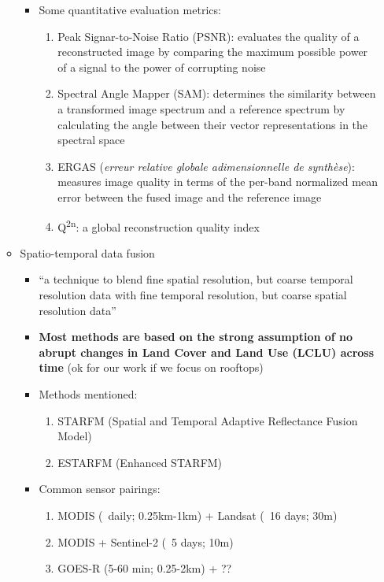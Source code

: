 \begin{itemize}
\begin{itemize}
\begin{itemize}
\begin{enumerate}
                        \end{enumerate}
                    \item Some quantitative evaluation metrics:
                        \begin{enumerate}
                            \item Peak Signar-to-Noise Ratio (PSNR): evaluates the quality of a reconstructed image by comparing the maximum possible power of a signal to the power of corrupting noise
                            \item Spectral Angle Mapper (SAM): determines the similarity between a transformed image spectrum and a reference spectrum by calculating the angle between their vector representations in the spectral space
                            \item ERGAS (\textit{erreur relative globale adimensionnelle de synthèse}): measures image quality in terms of the per-band normalized mean error between the fused image and the reference image
                            \item Q\textsuperscript{2n}: a global reconstruction quality index 
                        \end{enumerate}
                \end{itemize}
            \item Spatio-temporal data fusion
                \begin{itemize}
                    \item ``a technique to blend fine spatial resolution, but coarse temporal resolution data with fine temporal resolution, but coarse spatial resolution data''
                    \item \textbf{Most methods are based on the strong assumption of no abrupt changes in Land Cover and Land Use (LCLU) across time} (ok for our work if we focus on rooftops)
                    \item Methods mentioned:
                    \begin{enumerate}
                        \item STARFM (Spatial and Temporal Adaptive Reflectance Fusion Model)
                        \item ESTARFM (Enhanced STARFM)
                    \end{enumerate}
                    \item Common sensor pairings: 
                        \begin{enumerate}
                            \item MODIS (~daily; 0.25km-1km) + Landsat (~16 days; 30m)
                            \item MODIS + Sentinel-2 (~5 days; 10m)
                            \item GOES-R (5-60 min; 0.25-2km) + ?? 
                        \end{enumerate}
                    

\end{itemize}
\end{itemize}
\end{itemize}

